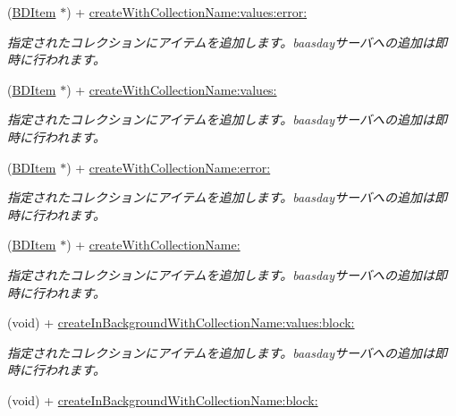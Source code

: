 \begin{DoxyCompactItemize}
\item 
(\hyperlink{interface_b_d_item}{B\-D\-Item} $\ast$) + \hyperlink{interface_b_d_item_a93fba1f3937a4d073f55e2d3b8e270c1}{create\-With\-Collection\-Name\-:values\-:error\-:}
\begin{DoxyCompactList}\small\item\em 指定されたコレクションにアイテムを追加します。baasdayサーバへの追加は即時に行われます。 \end{DoxyCompactList}\item 
(\hyperlink{interface_b_d_item}{B\-D\-Item} $\ast$) + \hyperlink{interface_b_d_item_a442423dcd231eb4283fe5ba734417956}{create\-With\-Collection\-Name\-:values\-:}
\begin{DoxyCompactList}\small\item\em 指定されたコレクションにアイテムを追加します。baasdayサーバへの追加は即時に行われます。 \end{DoxyCompactList}\item 
(\hyperlink{interface_b_d_item}{B\-D\-Item} $\ast$) + \hyperlink{interface_b_d_item_a7792723e5da18907ff09a4cb58500983}{create\-With\-Collection\-Name\-:error\-:}
\begin{DoxyCompactList}\small\item\em 指定されたコレクションにアイテムを追加します。baasdayサーバへの追加は即時に行われます。 \end{DoxyCompactList}\item 
(\hyperlink{interface_b_d_item}{B\-D\-Item} $\ast$) + \hyperlink{interface_b_d_item_ae5bfedc28fe415ff3204eb4ebd79d659}{create\-With\-Collection\-Name\-:}
\begin{DoxyCompactList}\small\item\em 指定されたコレクションにアイテムを追加します。baasdayサーバへの追加は即時に行われます。 \end{DoxyCompactList}\item 
(void) + \hyperlink{interface_b_d_item_a41a9770731ef057b35c4728275145629}{create\-In\-Background\-With\-Collection\-Name\-:values\-:block\-:}
\begin{DoxyCompactList}\small\item\em 指定されたコレクションにアイテムを追加します。baasdayサーバへの追加は即時に行われます。 \end{DoxyCompactList}\item 
(void) + \hyperlink{interface_b_d_item_a37bf7a8e97571dcfcdd042360b983ab5}{create\-In\-Background\-With\-Collection\-Name\-:block\-:}

\end{DoxyCompactItemize}
